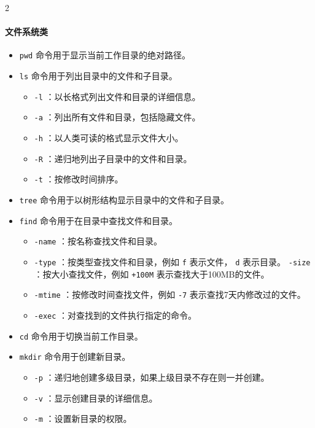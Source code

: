\begin{multicols}{2}
    \paragraph{文件系统类}
    \begin{itemize}
        \item  \texttt{pwd} 命令用于显示当前工作目录的绝对路径。
        \item  \texttt{ls} 命令用于列出目录中的文件和子目录。
            \begin{itemize}
                \item  \texttt{-l} ：以长格式列出文件和目录的详细信息。
                \item  \texttt{-a} ：列出所有文件和目录，包括隐藏文件。
                \item  \texttt{-h} ：以人类可读的格式显示文件大小。
                \item  \texttt{-R} ：递归地列出子目录中的文件和目录。
                \item  \texttt{-t} ：按修改时间排序。
            \end{itemize}
        \item  \texttt{tree} 命令用于以树形结构显示目录中的文件和子目录。
        \item  \texttt{find} 命令用于在目录中查找文件和目录。
            \begin{itemize}
                \item  \texttt{-name} ：按名称查找文件和目录。
                \item  \texttt{-type} ：按类型查找文件和目录，例如 \texttt{f} 表示文件， \texttt{d} 表示目录。
                    \texttt{-size} ：按大小查找文件，例如 \texttt{+100M} 表示查找大于100MB的文件。
                \item  \texttt{-mtime} ：按修改时间查找文件，例如 \texttt{-7} 表示查找7天内修改过的文件。
                \item  \texttt{-exec} ：对查找到的文件执行指定的命令。
            \end{itemize}
        \item  \texttt{cd} 命令用于切换当前工作目录。
        \item  \texttt{mkdir} 命令用于创建新目录。
            \begin{itemize}
                \item  \texttt{-p} ：递归地创建多级目录，如果上级目录不存在则一并创建。
                \item  \texttt{-v} ：显示创建目录的详细信息。
                \item  \texttt{-m} ：设置新目录的权限。

\end{itemize}
\end{itemize}
\end{multicols}
